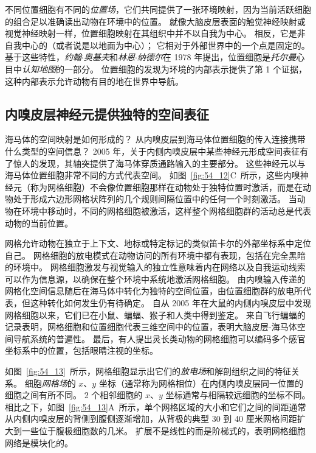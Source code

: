 不同位置细胞有不同的\textit{位置场}，它们共同提供了一张环境映射，因为当前活跃细胞的组合足以准确读出动物在环境中的位置。
就像大脑皮层表面的触觉神经映射或视觉神经映射一样，位置细胞映射在其组织中并不以自我为中心。
相反，它是非自我中心的（或者说是以地面为中心）；
它相对于外部世界中的一个点是固定的。
基于这些特性，\textit{约翰$\cdot$奥基夫}和\textit{林恩$\cdot$纳德尔}在 1978 年提出，位置细胞是\textit{托尔曼}心目中\textit{认知地图}的一部分。
位置细胞的发现为环境的内部表示提供了第 1 个证据，这种内部表示允许动物有目的地在世界中导航。



\subsection{内嗅皮层神经元提供独特的空间表征}

海马体的空间映射是如何形成的？
从内嗅皮层到海马体位置细胞的传入连接携带什么类型的空间信息？
2005 年，关于内侧内嗅皮层中某些神经元形成空间表征有了惊人的发现，其轴突提供了海马体穿质通路输入的主要部分\cite{hafting2005microstructure}。
这些神经元以与海马体位置细胞非常不同的方式代表空间。
如图~\ref{fig:54_12}C~所示，这些内嗅神经元（称为网格细胞）不会像位置细胞那样在动物处于独特位置时激活，而是在动物处于形成六边形网格状阵列的几个规则间隔位置中的任何一个时刻激活。
当动物在环境中移动时，不同的网格细胞被激活，这样整个网格细胞群的活动总是代表动物的当前位置。


网格允许动物在独立于上下文、地标或特定标记的类似笛卡尔的外部坐标系中定位自己。
网格细胞的放电模式在动物访问的所有环境中都有表现，包括在完全黑暗的环境中。
网格细胞激发与视觉输入的独立性意味着内在网络以及自我运动线索可以作为信息源，以确保在整个环境中系统地激活网格细胞。
由内嗅输入传递的网格化空间信息随后在海马体中转化为独特的空间位置，由位置细胞群的放电所代表，但这种转化如何发生仍有待确定。
自从 2005 年在大鼠的内侧内嗅皮层中发现网格细胞以来，它们已在小鼠、蝙蝠、猴子和人类中得到鉴定。
来自飞行蝙蝠的记录表明，网格细胞和位置细胞代表三维空间中的位置，表明大脑皮层-海马体空间导航系统的普遍性。
最后，有人提出灵长类动物的网格细胞可以编码多个感官坐标系中的位置，包括眼睛注视的坐标。


如图~\ref{fig:54_13}~所示，网格细胞显示出它们的\textit{放电场}和解剖组织之间的特征关系。
细胞\textit{网格场}的 $x$、$y$ 坐标（通常称为网格相位）在内侧内嗅皮层同一位置的细胞之间有所不同。
2 个相邻细胞的 $x$、$y$ 坐标通常与相隔较远细胞的坐标不同。
相比之下，如图~\ref{fig:54_13}A~所示，单个网格区域的大小和它们之间的间距通常从内侧内嗅皮层的背侧到腹侧逐渐增加，从背极的典型 30 到 40 厘米网格间距扩大到一些位于腹极细胞数的几米。
扩展不是线性的而是阶梯式的，表明网格细胞网络是模块化的。


